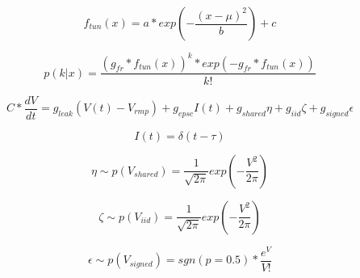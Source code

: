 \documentclass{article}
\begin{document}
\begin{equation}
f_{tun}(x) = a * exp{\left( -\frac{(x-\mu)^{2}}{b} \right)} + c
\end{equation}

\begin{equation}
p(k | x) = \frac{(g_{fr}*f_{tun}(x))^{k} * exp{\left(-g_{fr}*f_{tun}(x)\right)}}{k!}
\end{equation}

\begin{equation}
C*\frac{dV}{dt} = g_{leak}(V(t) - V_{rmp}) + g_{epsc}I(t) + g_{shared}\eta + g_{iid}\zeta + g_{signed}\epsilon
\end{equation}

\begin{equation}
I(t) = \delta(t-\tau)
\end{equation}

\begin{equation}
\eta \sim p(V_{shared}) = \frac{1}{\sqrt{2\pi}} exp{\left(-\frac{V^{2}}{2\pi} \right)}
\end{equation}

\begin{equation}
\zeta \sim p(V_{iid}) = \frac{1}{\sqrt{2\pi}} exp{\left(-\frac{V^{2}}{2\pi} \right)}
\end{equation}

\begin{equation}
\epsilon \sim p(V_{signed}) = sgn(p=0.5) * \frac{e^{V}}{V!}
\end{equation}
	
\end{document}
